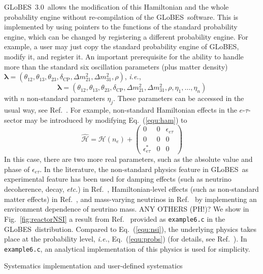\documentclass[12pt,a4paper]{article}
\makeatletter
\renewcommand{\section}{\@startsection{section}{1}{0em}{-\baselineskip}%
{\baselineskip}{\normalfont\large\bfseries}}
\newcommand{\ie}{{\it i.e.}}
\newcommand{\etc}{{\it etc.}}
\newcommand{\eq}{Eq.}
\newcommand{\fig}{Fig.}
\newcommand{\Ref}{Ref.}
\newcommand{\ldm}{\Delta m_{31}^2}
\newcommand{\sdm}{\Delta m_{21}^2}
\newcommand{\deltacp}{\delta_{\mathrm{CP}}}
\newcommand{\GLOBES}{{\sf GLoBES}}
\newcommand{\GLOBESN}{{\sf GLoBES~3.0}}
\newcommand{\equ}[1]{\eq~(\ref{equ:#1})}
\newcommand{\figu}[1]{\fig~\ref{fig:#1}}
\makeatother
\begin{document}
\GLOBESN\ allows the modification of this Hamiltonian and the whole probability engine without
re-compilation of the \GLOBES\ software. This is implemented
by using pointers to the functions of the standard probability engine, which can be changed by
registering a different probability engine. For example, a user may just copy the standard probability
engine of \GLOBES , modify it, and register it. An important prerequisite for the ability to handle
more than the standard six oscillation parameters (plus matter density) $\boldsymbol{\lambda}=(\theta_{12},\theta_{13}, \theta_{23}, \deltacp, \sdm, \ldm, \rho)$, \ie,
\begin{equation}
\boldsymbol{\lambda}=(\theta_{12},\theta_{13}, \theta_{23}, \deltacp, \sdm, \ldm, \rho, \eta_1, \hdots, \eta_n)
\end{equation}
with $n$ non-standard parameters $\eta_j$. These parameters can be accessed in the usual way, see \Ref~\cite{Manual}.
For example, non-standard Hamiltonian effects in the $e$-$\tau$-sector may be introduced by modifying \equ{ham} to
\begin{equation}
 \mathcal{\hat{H}} = \mathcal{H}(n_e) + 
\left(
\begin{array}{ccc}
0 & 0 & \epsilon_{e \tau} \\
0 & 0 & 0 \\
\epsilon_{e \tau}^* & 0 & 0 
\end{array}
\right)
\label{equ:nsi}
\end{equation}
In this case, there are two more real parameters, such as the absolute value and phase of $\epsilon_{e \tau}$.
In the literature, the non-standard physics feature in \GLOBES\ as experimental feature has been used for damping effects (such as neutrino decoherence, decay, \etc) in \Ref~\cite{Blennow:2005yk}, Hamiltonian-level effects (such as non-standard matter effects) in \Ref~\cite{Blennow:2005qj}, and mass-varying neutrinos in \Ref~\cite{Schwetz:2005fy} by implementing an environment dependence of neutrino mass.  ANY OTHERS (PH!)?
We show in \figu{reactorNSI} a result from \Ref~\cite{Blennow:2005yk} provided as {\tt example6.c} in the \GLOBES\
distribution. Compared to \equ{nsi}, the underlying physics takes place at the probability level, \ie, 
\equ{probs} (for details, see \Ref~\cite{Blennow:2005yk}). In {\tt example6.c}, an analytical implementation
of this physics is used for simplicity.

\section{Systematics implementation and user-defined systematics}
\end{document}
